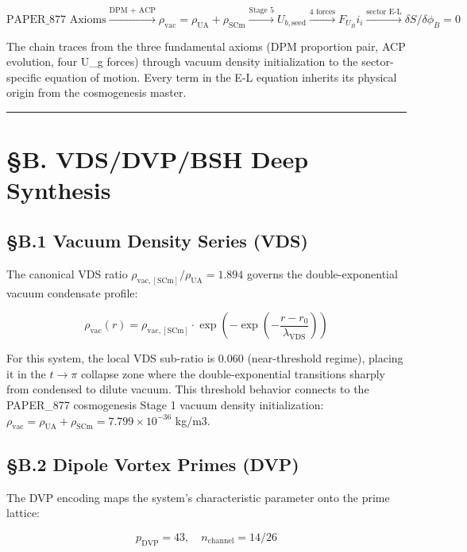 \documentclass[12pt,a4paper]{article}
\begin{document}
\begin{equation}
\text{PAPER\_877 Axioms} \xrightarrow{\text{DPM + ACP}} \rho_{\mathrm{vac}} = \rho_{\mathrm{UA}} + \rho_{\mathrm{SCm}} \xrightarrow{\text{Stage 5}} U_{b,\mathrm{seed}} \xrightarrow{\text{4 forces}} F_U_Bi_i \xrightarrow{\text{sector E-L}} \delta S/\delta \phi_B = 0
\end{equation}

The chain traces from the three fundamental axioms (DPM proportion pair, ACP evolution, four U\_g forces) through vacuum density initialization to the sector-specific equation of motion. Every term in the E-L equation inherits its physical origin from the cosmogenesis master.

\medskip\hrule\medskip

\section{\S{}B. VDS/DVP/BSH Deep Synthesis}

\subsection{\S{}B.1 Vacuum Density Series (VDS)}

The canonical VDS ratio $\rho_{\mathrm{vac,[SCm]}} / \rho_{\mathrm{UA}} = 1.894$ governs the double-exponential vacuum condensate profile:

\begin{equation}
\rho_{\mathrm{vac}}(r) = \rho_{\mathrm{vac,[SCm]}} \cdot \exp\!\left(-\exp\!\left(-\frac{r - r_0}{\lambda_{\mathrm{VDS}}}\right)\right)
\end{equation}

For this system, the local VDS sub-ratio is $0.060$ (near-threshold regime), placing it in the $t \to \pi$ collapse zone where the double-exponential transitions sharply from condensed to dilute vacuum. This threshold behavior connects to the PAPER\_877 cosmogenesis Stage 1 vacuum density initialization: $\rho_{\mathrm{vac}} = \rho_{\mathrm{UA}} + \rho_{\mathrm{SCm}} = 7.799 \times 10^{-36}$ kg/m3.

\subsection{\S{}B.2 Dipole Vortex Primes (DVP)}

The DVP encoding maps the system's characteristic parameter onto the prime lattice:

\begin{equation}
p_{\mathrm{DVP}} = 43, \quad n_{\mathrm{channel}} = 14/26
\end{equation}
\end{document}
